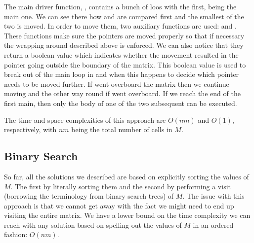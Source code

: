 

The main driver function, , contains a bunch of loos with the first, being the main one. We can see there how  and  are compared first and the smallest of the two is moved. In order to move them, two auxiliary functions are used:  and . These functions make sure the pointers are moved properly so that if necessary the wrapping around described above is enforced. We can also notice that they return a boolean value which indicates whether the movement resulted in the pointer going outside the boundary of the matrix.
This boolean value is used to break out of the main loop in  and when this happens to decide which pointer needs to be moved further. If  went overboard the matrix then we continue moving  and the other way round if  went overboard. If we reach the end of the first main, then only the body of one of the two subsequent  can be executed.

The time and space complexities of this approach are $O(nm)$ and $O(1)$, respectively, with $nm$ being the total number of cells in $M$.

\subsection{Binary Search}
\label{kth_smallest_in_sorted_matrix:sec:binarysearch}
So far, all the solutions we described are based on explicitly sorting the values of $M$. The first by literally sorting them and the second by performing a  visit (borrowing the terminology from binary search trees) of $M$. The issue with this approach is that we cannot get away with the fact we might need to end up visiting the entire matrix. We have a lower bound on the time complexity we can reach with any solution based on spelling out the values of $M$ in an ordered fashion: $O(nm)$.

